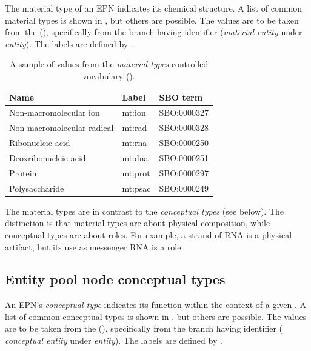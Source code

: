 The material type of an EPN indicates its chemical structure.  A list
of common material types is shown in , but
others are possible.  The values are to be taken from the \sbo
(\sbourl), specifically from the branch having identifier
 ($\!$\emph{material entity} under \emph{entity}).
The labels are defined by \SBGNPDLone.

\begin{table}[h]
  \centering
  \begin{tabular}{l>{\ttfamily}l>{\ttfamily}l}
    \toprule
    \textbf{Name}              & \textbf{\rmfamily Label} & \textbf{\rmfamily SBO term} \\
    \midrule
    Non-macromolecular ion     & mt:ion  & SBO:0000327\\
    Non-macromolecular radical & mt:rad  & SBO:0000328\\
    Ribonucleic acid           & mt:rna  & SBO:0000250\\
    Deoxribonucleic acid       & mt:dna  & SBO:0000251\\
    Protein                    & mt:prot & SBO:0000297\\
    Polysaccharide             & mt:psac & SBO:0000249\\
    \bottomrule
  \end{tabular}
  \caption{A sample of values from the \emph{material types} controlled
    vocabulary ().}
  \label{tab:material-types-cv}
\end{table}

The material types are in contrast to the \emph{conceptual types} (see
below).  The distinction is that material types are about physical
composition, while conceptual types are about roles.  For example, a
strand of RNA is a physical artifact, but its use as messenger RNA is
a role.


\subsection{Entity pool node conceptual types}
\label{sec:conceptual-types-cv}

An EPN's \emph{conceptual type} indicates its function within the
context of a given \PD.  A list of common conceptual types is shown in
, but others are possible.  The values are to
be taken from the \sbo (\sbourl), specifically from the branch having
identifier  ($\!$\emph{conceptual entity} under
\emph{entity}).  The labels are defined by \SBGNPDLone.

